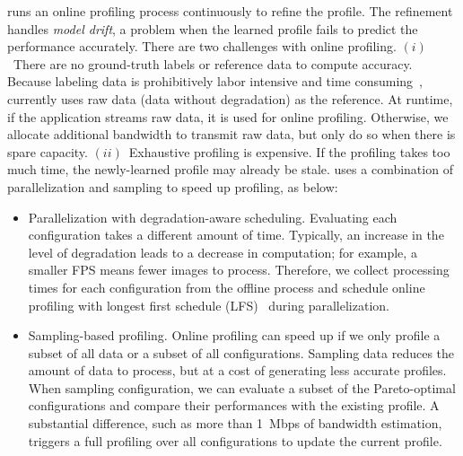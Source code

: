 
 \sysname{} runs an online profiling process
continuously to refine the profile. The refinement handles \textit{model drift},
a problem when the learned profile fails to predict the performance
accurately. There are two challenges with online profiling.  $(i)$~There are no
ground-truth labels or reference data to compute accuracy. Because labeling data
is prohibitively labor intensive and time consuming~\cite{russell2008labelme},
\sysname{} currently uses raw data (data without degradation) as the
reference. At runtime, if the application streams raw data, it is used for
online profiling. Otherwise, we allocate additional bandwidth to transmit raw
data, but only do so when there is spare capacity. $(ii)$~Exhaustive profiling
is expensive. If the profiling takes too much time, the newly-learned profile
may already be stale. \sysname{} uses a combination of parallelization and
sampling to speed up profiling, as below:

\begin{itemize}[leftmargin=*, topsep=0pt, itemsep=0pt]

\item Parallelization with degradation-aware scheduling. Evaluating each
  configuration takes a different amount of time. Typically, an increase in the
  level of degradation leads to a decrease in computation; for example, a
  smaller FPS means fewer images to process. Therefore, we collect processing
  times for each configuration from the offline process and schedule online
  profiling with longest first schedule (LFS)~\cite{karger2010scheduling} during
  parallelization.

\item Sampling-based profiling. Online profiling can speed up if we only profile
  a subset of all data or a subset of all configurations.  Sampling data reduces
  the amount of data to process, but at a cost of generating less accurate
  profiles. When sampling configuration, we can evaluate a subset of the
  Pareto-optimal configurations and compare their performances with the existing
  profile. A substantial difference, such as more than \SI{1}{Mbps} of bandwidth
  estimation, triggers a full profiling over all configurations to update the
  current profile.

\end{itemize}


